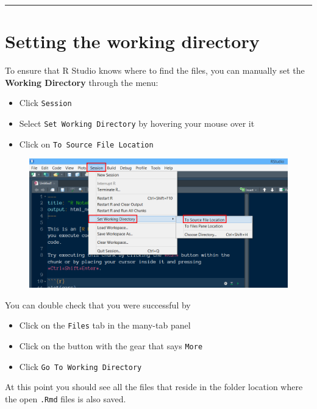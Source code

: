 \documentclass[]{book}
\providecommand{\tightlist}{%
  \setlength{\itemsep}{0pt}\setlength{\parskip}{0pt}}
\theoremstyle{definition}
\theoremstyle{definition}
\theoremstyle{definition}
\theoremstyle{remark}
\begin{document}
\begin{center}\rule{0.5\linewidth}{\linethickness}\end{center}

\section{Setting the working
directory}\label{setting-the-working-directory}

To ensure that R Studio knows where to find the files, you can manually
set the \textbf{Working Directory} through the menu:

\begin{itemize}
\tightlist
\item
  Click \texttt{Session}
\item
  Select \texttt{Set\ Working\ Directory} by hovering your mouse over it
\item
  Click on \texttt{To\ Source\ File\ Location}
\end{itemize}

\begin{figure}
\centering
\includegraphics{img/Set_wd_source.png}
\caption{}
\end{figure}

You can double check that you were successful by

\begin{itemize}
\tightlist
\item
  Click on the \texttt{Files} tab in the many-tab panel
\item
  Click on the button with the gear that says \texttt{More}
\item
  Click \texttt{Go\ To\ Working\ Directory}
\end{itemize}

At this point you should see all the files that reside in the folder
location where the open \texttt{.Rmd} files is also saved.
\end{document}
